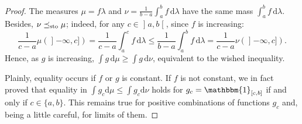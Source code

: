 \documentclass[10pt,a4paper]{article}
\theoremstyle{plain}
\theoremstyle{definition}
\newcommand{\dd}{\mathrm{d}}
\newcommand{\one}{\mathbbm{1}}
\newcommand{\la}{\lambda}
\newcommand{\leqs}{\preceq_{\text{\rm sto}}}
\newcommand{\op}{\mathopen}
\newcommand{\clo}{\mathclose}
\begin{document}
\begin{proof} The %
measures $\mu=f\la$ and $\nu=\frac1{b-a}\int_a^b f\,\dd\la$ have the same mass $\int_a^b f\,\dd\la$. Besides, $\nu\leqs\mu$; indeed, for any $c\in\op]a,b\clo[$, since $f$ is increasing:
\[\frac1{c-a}\mu(\op]-\infty,c])=\frac1{c-a}\int_{a}^c f\,\dd\la\leq\frac1{b-a}\int_{a}^b f\,\dd\la=\frac1{c-a}\nu(\op]-\infty,c]).\]
Hence, as $g$ is increasing, $\int g\,\dd\mu\geq\int g\,\dd\nu$, equivalent to the wished inequality.

Plainly, equality occurs if $f$ or $g$ is constant. If $f$ is not constant, we in fact proved that equality in $\int g_c \dd \mu\leq \int g_c \dd \nu$ holds for $g_c=\one_{[c,b]}$ if and only if $c\in\{a,b\}$. This remains true for positive combinations of functions $g_c$ and, being a little careful, for limits of them.
\end{proof}
\end{document}
